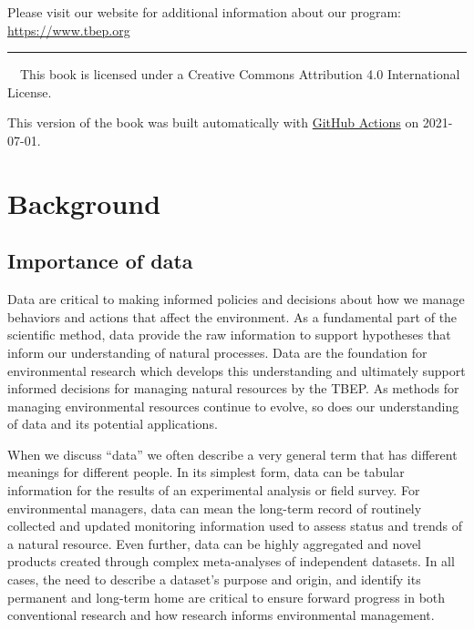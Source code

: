 \documentclass[
]{book}
\begin{document}
Please visit our website for additional information about our program: \url{https://www.tbep.org}

\begin{center}\rule{0.5\linewidth}{0.5pt}\end{center}

~~This book is licensed under a Creative Commons Attribution 4.0 International License.

This version of the book was built automatically with \href{https://github.com/tbep-tech/data-management-sop/actions}{GitHub Actions} on 2021-07-01.

\hypertarget{background}{%
\chapter{Background}\label{background}}

\hypertarget{dataimp}{%
\section{Importance of data}\label{dataimp}}

Data are critical to making informed policies and decisions about how we manage behaviors and actions that affect the environment. As a fundamental part of the scientific method, data provide the raw information to support hypotheses that inform our understanding of natural processes. Data are the foundation for environmental research which develops this understanding and ultimately support informed decisions for managing natural resources by the TBEP. As methods for managing environmental resources continue to evolve, so does our understanding of data and its potential applications.

When we discuss ``data'' we often describe a very general term that has different meanings for different people. In its simplest form, data can be tabular information for the results of an experimental analysis or field survey. For environmental managers, data can mean the long-term record of routinely collected and updated monitoring information used to assess status and trends of a natural resource. Even further, data can be highly aggregated and novel products created through complex meta-analyses of independent datasets. In all cases, the need to describe a dataset's purpose and origin, and identify its permanent and long-term home are critical to ensure forward progress in both conventional research and how research informs environmental management.
\end{document}
